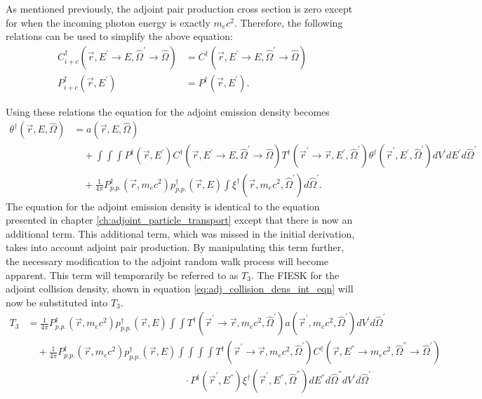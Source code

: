 As mentioned previously, the adjoint pair production cross section is zero 
except for when the incoming photon energy is exactly $m_ec^2$. Therefore, the 
following relations can be used to simplify the above equation:
\begin{align}
  C_{i+c}^{\dagger}(\vec{r},E^{'} \to E, \hat{\Omega}^{'} \to \hat{\Omega}) & = 
  C^{\dagger}(\vec{r},E^{'} \to E, \hat{\Omega}^{'} \to \hat{\Omega}) \\
  P_{i+c}^{\dagger}(\vec{r},E^{'}) & = P^{\dagger}(\vec{r},E^{'}).
\end{align}

Using these relations the equation for the adjoint emission density becomes
\begin{align}
  \theta^{\dagger}(\vec{r},E,\hat{\Omega}) & = a(\vec{r},E,\hat{\Omega})
  \nonumber \\
  & \quad + \int\int\int P^{\dagger}(\vec{r},E^{'})
  C^{\dagger}(\vec{r},E^{'} \to E, \hat{\Omega}^{'} \to \hat{\Omega})
  T^{\dagger}(\vec{r}^{'} \to \vec{r},E^{'},\hat{\Omega}^{'})
    \theta^{\dagger}(\vec{r}^{'},E^{'},\hat{\Omega}^{'})
    dV^{'} dE^{'} d\hat{\Omega}^{'} \nonumber \\
  & \quad + \frac{1}{4\pi}P_{p.p.}^{\dagger}(\vec{r},m_ec^2)
  p_{p.p.}^{\dagger}(\vec{r},E)
  \int \xi^{\dagger}(\vec{r},m_ec^2,\hat{\Omega}^{'}) d\hat{\Omega}^{'}.
\end{align}
The equation for the adjoint emission density is identical to the equation
presented in chapter \ref{ch:adjoint_particle_transport} except that there is
now an additional term. This additional term, which was missed in the initial
derivation, takes into account adjoint pair production. By manipulating this 
term further, the necessary modification to the adjoint random walk process
will become apparent. This term will temporarily be referred to as  $T_3$. 
The FIESK for the adjoint collision density, shown in equation 
\ref{eq:adj_collision_dens_int_eqn} will now be substituted into $T_3$.
\begin{align}
  T_3 & = \frac{1}{4\pi}P_{p.p.}^{\dagger}(\vec{r},m_ec^2)
  p_{p.p.}^{\dagger}(\vec{r},E) 
  \int\int T^{\dagger}(\vec{r}^{'} \to \vec{r},m_ec^2,\hat{\Omega}^{'})
  a(\vec{r}^{'},m_ec^2,\hat{\Omega}^{'}) dV^{'}d\hat{\Omega}^{'} \nonumber \\
  & \quad + \frac{1}{4\pi}P_{p.p.}^{\dagger}(\vec{r},m_ec^2)
  p_{p.p.}^{\dagger}(\vec{r},E) \int\int\int\int
  T^{\dagger}(\vec{r}^{'} \to \vec{r},m_ec^2,\hat{\Omega}^{'})
  C^{\dagger}(\vec{r},E^{''} \to m_ec^2, \hat{\Omega}^{''} \to \hat{\Omega}^{'})
  \nonumber \\
  & \qquad \qquad \qquad \qquad \qquad \qquad \qquad \qquad \cdot
  P^{\dagger}(\vec{r}^{'},E^{''}) \xi^{\dagger}(\vec{r}^{'},E^{''},\hat{\Omega}^{''}) 
  dE^{''}d\hat{\Omega}^{''}dV^{'}d\hat{\Omega}^{'}
  \nonumber 
\end{align}
